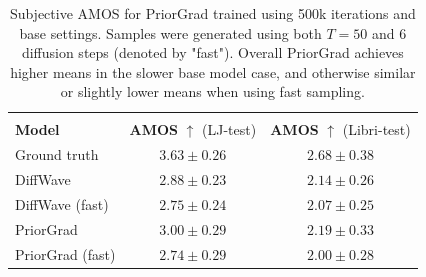 \documentclass{report}
\begin{document}
\begin{table}[H]
\centering
\def\arraystretch{1.3}
\begin{tabular}{l | c | c }
\hline\hline
\vspace{-0.5cm} \\
\textbf{Model} & \textbf{AMOS} $\uparrow$ (LJ-test) & \textbf{AMOS} $\uparrow$ (Libri-test) \\ [0.5ex]
\hline
Ground truth  & $3.63 \pm 0.26$ & $2.68 \pm 0.38$\\
\hline
DiffWave & $2.88 \pm 0.23$ & $2.14 \pm 0.26$ \\
\hline
DiffWave (fast) & $2.75 \pm 0.24$ & $2.07 \pm 0.25$ \\
\hline
PriorGrad & $3.00 \pm 0.29$ & $ 2.19 \pm 0.33 $ \\
\hline
PriorGrad (fast) & $ 2.74 \pm 0.29 $ & $ 2.00 \pm 0.28 $ \\
\hline\hline
\end{tabular}
\caption{\onehalfspacing Subjective AMOS for PriorGrad trained using 500k iterations and base settings. Samples were generated using both $T=50$ and $6$ diffusion steps (denoted by "fast"). Overall PriorGrad achieves higher means in the slower base model case, and otherwise similar or slightly lower means when using fast sampling.}
\label{table:prioramos}
\end{table}

\end{document}
